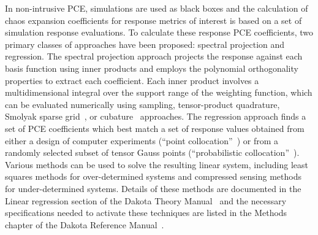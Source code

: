 In non-intrusive PCE, simulations are used as black boxes and the
calculation of chaos expansion coefficients for response metrics of
interest is based on a set of simulation response evaluations. To
calculate these response PCE coefficients, two primary classes of
approaches have been proposed: spectral projection and regression. The
spectral projection approach projects the response against each basis
function using inner products and employs the polynomial orthogonality
properties to extract each coefficient. Each inner product involves a
multidimensional integral over the support range of the weighting
function, which can be evaluated numerically using sampling,
tensor-product quadrature, Smolyak sparse grid~\cite{Smolyak_63}, or
cubature~\cite{stroud} approaches. The regression approach finds a set
of PCE coefficients which best match a set of response values obtained
from either a design of computer experiments (``point
collocation''~\cite{pt_colloc1}) or from a randomly selected subset of
tensor Gauss points (``probabilistic
collocation''~\cite{Tat95}). Various methods can be used to solve the
resulting linear system, including least squares methods for
over-determined systems and compressed sensing methods for
under-determined systems. Details of these methods are documented in
the Linear regression section of the Dakota Theory
Manual~\cite{TheoMan} and the necessary specifications needed to
activate these techniques are listed in the Methods chapter of the
Dakota Reference Manual~\cite{RefMan}.

